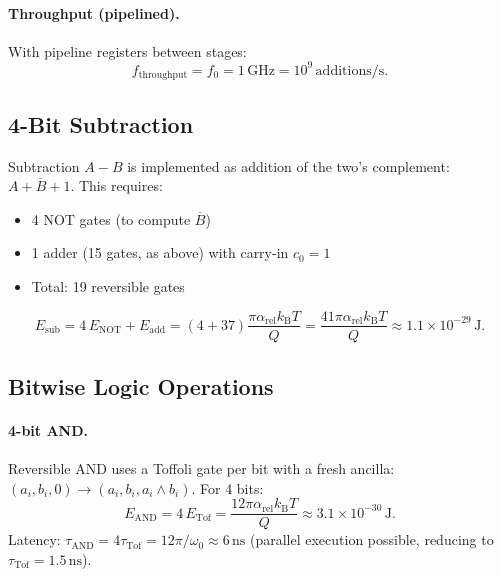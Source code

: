 \documentclass[11pt,twocolumn]{article}
\theoremstyle{definition}
\theoremstyle{remark}
\newcommand{\kB}{k_{\mathrm{B}}}
\begin{document}
\paragraph{Throughput (pipelined).}
With pipeline registers between stages:
\begin{equation}
f_{\mathrm{throughput}} = f_0 = 1\,\mathrm{GHz} = 10^9\,\mathrm{additions/s}.
\end{equation}

\subsection{4-Bit Subtraction}\label{sec:subtractor}

Subtraction $A - B$ is implemented as addition of the two's complement:
$A + \overline{B} + 1$. This requires:
\begin{itemize}
\item 4 NOT gates (to compute $\overline{B}$)
\item 1 adder (15 gates, as above) with carry-in $c_0 = 1$
\item Total: 19 reversible gates
\end{itemize}

\begin{equation}
E_{\mathrm{sub}} = 4\,E_{\mathrm{NOT}} + E_{\mathrm{add}}
= \left(4 + 37\right)\frac{\pi\alpha_{\mathrm{rel}}\kB T}{Q}
= \frac{41\pi\alpha_{\mathrm{rel}}\kB T}{Q}
\approx 1.1\times 10^{-29}\,\mathrm{J}.
\end{equation}

\subsection{Bitwise Logic Operations}\label{sec:bitwise}

\paragraph{4-bit AND.}
Reversible AND uses a Toffoli gate per bit with a fresh ancilla:
$(a_i, b_i, 0) \to (a_i, b_i, a_i \wedge b_i)$. For 4 bits:
\begin{equation}
E_{\mathrm{AND}} = 4\,E_{\mathrm{Tof}} = \frac{12\pi\alpha_{\mathrm{rel}}\kB T}{Q}
\approx 3.1\times 10^{-30}\,\mathrm{J}.
\end{equation}
Latency: $\tau_{\mathrm{AND}} = 4\tau_{\mathrm{Tof}} = 12\pi/\omega_0
\approx 6\,\mathrm{ns}$ (parallel execution possible, reducing to
$\tau_{\mathrm{Tof}} = 1.5\,\mathrm{ns}$).
\end{document}
